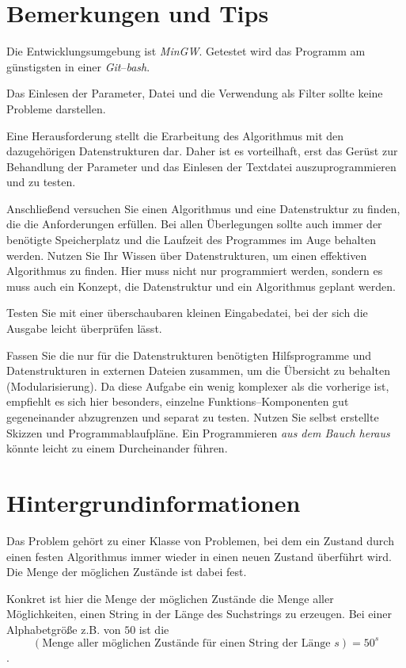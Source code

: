 \documentclass[paper=a4,notitlepage,parskip=half,plainheadsepline]{scrartcl}
\newcommand{\mingw}{\textsl{MinGW}}
\newcommand{\bash}{\emph{bash}}
\newcommand{\git}{\emph{Git}}
\begin{document}
\section{Bemerkungen und Tips}
Die Entwicklungsumgebung ist \mingw. Getestet wird das Programm am günstigsten in einer \git--\bash.

Das Einlesen der Parameter, Datei und die Verwendung als Filter sollte keine Probleme darstellen.

Eine Herausforderung stellt die Erarbeitung des Algorithmus mit den dazugehörigen Datenstrukturen dar. Daher ist es vorteilhaft, erst das Gerüst zur Behandlung der Parameter und das Einlesen der Textdatei auszuprogrammieren und zu testen.

Anschließend versuchen Sie einen Algorithmus und eine Datenstruktur zu finden, die die Anforderungen erfüllen. Bei allen Überlegungen sollte auch immer der benötigte Speicherplatz und die Laufzeit des Programmes im Auge behalten werden.
Nutzen Sie Ihr Wissen über Datenstrukturen, um einen effektiven Algorithmus zu finden. Hier muss nicht nur programmiert werden, sondern es muss auch ein Konzept, die Datenstruktur und ein Algorithmus geplant werden.

Testen Sie mit einer überschaubaren kleinen Eingabedatei, bei der sich die Ausgabe leicht überprüfen lässt.

Fassen Sie die nur für die Datenstrukturen benötigten Hilfsprogramme und Datenstrukturen in externen Dateien zusammen, um die Übersicht zu behalten (Modularisierung). Da diese Aufgabe ein wenig komplexer als die vorherige ist, empfiehlt es sich hier besonders, einzelne Funktions--Komponenten gut gegeneinander abzugrenzen und separat zu testen. Nutzen Sie selbst erstellte Skizzen und Programmablaufpläne. Ein Programmieren \emph{aus dem Bauch heraus} könnte leicht zu einem Durcheinander führen.

\section{Hintergrundinformationen}
Das Problem gehört zu einer Klasse von Problemen, bei dem ein Zustand durch einen festen Algorithmus immer wieder in einen neuen Zustand überführt wird. Die Menge der möglichen Zustände ist dabei fest.

Konkret ist hier die Menge der möglichen Zustände die Menge aller Möglichkeiten, einen String in der Länge des Suchstrings zu erzeugen. Bei einer Alphabetgröße z.B. von $50$ ist die
 $$(\text{Menge aller möglichen Zustände für einen String der Länge } s) =  50^s$$. 
\end{document}
